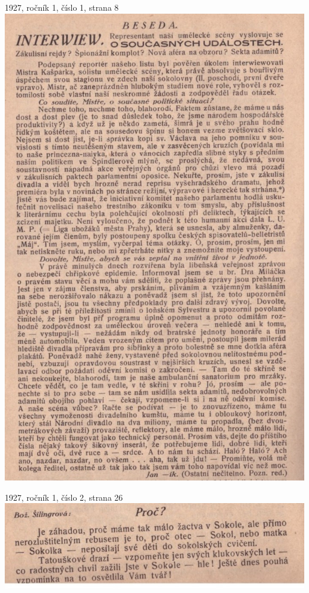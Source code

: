 \documentclass[11pt]{article}
\begin{document}
1927, ročník 1, číslo 1, strana 8\\
\includegraphics[width=\imagewidth]{original/1927/Skener_20250316 (2).jpg}

\vspace{\baselineskip}

1927, ročník 1, číslo 2, strana 26 \\
\includegraphics[width=\imagewidth]{original/1927/Skener_20250316 (3).jpg}
\end{document}

